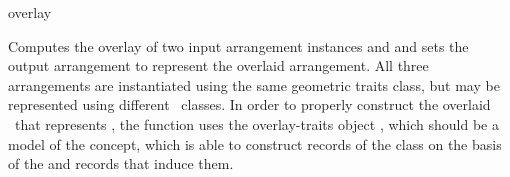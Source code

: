 
\ccRefPageBegin

\begin{ccRefFunction}{overlay}


   {Computes the overlay of two input arrangement instances  and
     and sets the output arrangement  to represent the
    overlaid arrangement. All three arrangements are instantiated using the
    same geometric traits class, but may be represented using different
    \dcel\ classes. In order to properly construct the overlaid \dcel\ that
    represents , the function uses the overlay-traits object
    , which should be a model of the  concept,
    which is able to construct records of the  class on the
    basis of the  and  records that induce them.
    }

\ccSeeAlso

\end{ccRefFunction}

\ccRefPageEnd
